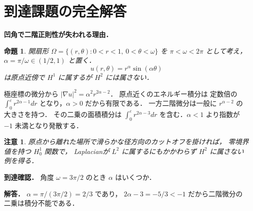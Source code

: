 \documentclass[a5paper,10pt,onecolumn]{jsarticle}
\makeatletter
\theoremstyle{mathnotetheorem}
\newtheorem{proposition}[theorem]{命題}
\newtheorem{remark}[theorem]{注意}
\renewcommand{\proofname}{証明}
\renewenvironment{proof}[1][\proofname]{%
  \par\pushQED{\qed}\normalfont\topsep4\p@\@plus2\p@\relax
  \trivlist\item[\hskip\labelsep\bfseries #1]\ignorespaces
}{\popQED\endtrivlist\@endpefalse}
\makeatother
\begin{document}
\section{到達課題の完全解答}
\noindent\textbf{凹角で二階正則性が失われる理由．}
\begin{proposition}
開扇形
$\Omega=\{(r,\theta):0<r<1,\ 0<\theta<\omega\}$
を $\pi<\omega<2\pi$ として考え，
$\alpha=\pi/\omega\in(1/2,1)$ と置く．
\[
u(r,\theta)=r^\alpha\sin(\alpha\theta)
\]
は原点近傍で $H^1$ に属するが $H^2$ には属さない．
\end{proposition}
\begin{proof}
極座標の微分から
$|\nabla u|^2=\alpha^2r^{2\alpha-2}$．
原点近くのエネルギー積分は
定数倍の $\int_0^\varepsilon r^{2\alpha-1}dr$
となり，$\alpha>0$ だから有限である．
一方二階微分は一般に
$r^{\alpha-2}$ の大きさを持つ．
その二乗の面積積分は
$\int_0^\varepsilon r^{2\alpha-3}dr$
を含む．$\alpha<1$ より指数が $-1$ 未満となり発散する．
\end{proof}
\begin{remark}
原点から離れた場所で滑らかな径方向のカットオフを掛ければ，
零境界値を持つ $H_0^1$ 関数で，
Laplacianが $L^2$ に属するにもかかわらず
$H^2$ に属さない例を得る．
\end{remark}
\noindent\textbf{到達確認．}
角度 $\omega=3\pi/2$ のとき $\alpha$ はいくつか．
\par\noindent\textbf{解答．}
$\alpha=\pi/(3\pi/2)=2/3$ であり，
$2\alpha-3=-5/3<-1$ だから二階微分の二乗は積分不能である．
\end{document}
